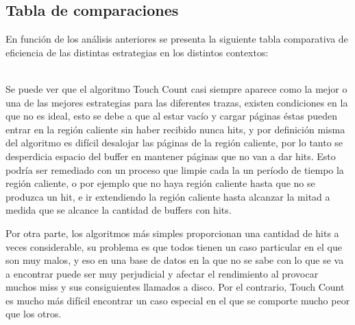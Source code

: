 \subsection{Tabla de comparaciones}
En funci\'on de los an\'alisis anteriores se presenta la siguiente tabla comparativa de eficiencia de las distintas estrategias en los distintos contextos:
\begin{center}
\end{center}

\\

Se puede ver que el algoritmo Touch Count casi siempre aparece como la mejor o una de las mejores estrategias para las diferentes trazas, existen condiciones en la que no es ideal, esto se debe a que al estar vac\'io y cargar p\'aginas \'estas pueden entrar en la regi\'on caliente sin haber recibido nunca hits, y por definici\'on misma del algoritmo es dif\'icil desalojar las p\'aginas de la regi\'on caliente, por lo tanto se desperdicia espacio del buffer en mantener p\'aginas que no van a dar hits. Esto podr\'ia ser remediado con un proceso que limpie cada la un per\'iodo de tiempo la regi\'on caliente, o por ejemplo que no haya regi\'on caliente hasta que no se produzca un hit, e ir extendiendo la regi\'on caliente hasta alcanzar la mitad a medida que se alcance la cantidad de buffers con hits.

Por otra parte, los algoritmos m\'as simples proporcionan una cantidad de hits a veces considerable, su problema es que todos tienen un caso particular en el que son muy malos, y eso en una base de datos en la que no se sabe con lo que se va a encontrar puede ser muy perjudicial y afectar el rendimiento al provocar muchos miss y sus consiguientes llamados a disco. Por el contrario, Touch Count es mucho m\'as dif\'icil encontrar un caso especial en el que se comporte mucho peor que los otros.

 

